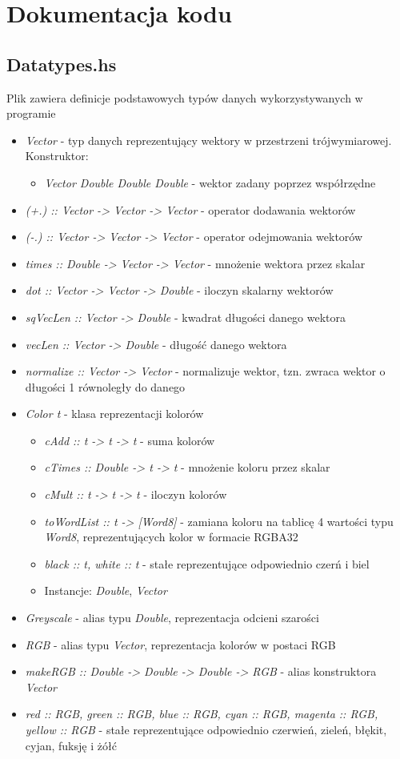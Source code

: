 \documentclass[11pt,a4paper]{article}
\begin{document}
\section{Dokumentacja kodu}
\subsection{Datatypes.hs}
Plik zawiera definicje podstawowych typów danych wykorzystywanych w programie
\begin{itemize}
\item\textit{Vector} - typ danych reprezentujący wektory w przestrzeni trójwymiarowej.\\Konstruktor:
\begin{itemize}
\item\textit{Vector Double Double Double} - wektor zadany poprzez współrzędne
\end{itemize}
\item\textit{(+.) :: Vector -> Vector -> Vector} - operator dodawania wektorów
\item\textit{(-.) :: Vector -> Vector -> Vector} - operator odejmowania wektorów
\item\textit{times :: Double -> Vector -> Vector} - mnożenie wektora przez skalar
\item\textit{dot :: Vector -> Vector -> Double} - iloczyn skalarny wektorów
\item\textit{sqVecLen :: Vector -> Double} - kwadrat długości danego wektora
\item\textit{vecLen :: Vector -> Double} - długość danego wektora
\item\textit{normalize :: Vector -> Vector} - normalizuje wektor, tzn. zwraca wektor o długości 1 równoległy do danego
\item\textit{Color t} - klasa reprezentacji kolorów
\begin{itemize}
\item\textit{cAdd :: t -> t -> t} - suma kolorów
\item\textit{cTimes :: Double -> t -> t} - mnożenie koloru przez skalar
\item\textit{cMult :: t -> t -> t} - iloczyn kolorów
\item\textit{toWordList :: t -> [Word8]} - zamiana koloru na tablicę 4 wartości typu \textit{Word8}, reprezentujących kolor w formacie RGBA32
\item\textit{black :: t, white :: t} - stałe reprezentujące odpowiednio czerń i biel
\item Instancje: \textit{Double}, \textit{Vector}
\end{itemize}
\item\textit{Greyscale} - alias typu \textit{Double}, reprezentacja odcieni szarości
\item\textit{RGB} - alias typu \textit{Vector}, reprezentacja kolorów w postaci RGB
\item\textit{makeRGB :: Double -> Double -> Double -> RGB} - alias konstruktora \textit{Vector}
\item\textit{red :: RGB, green :: RGB, blue :: RGB, cyan :: RGB, magenta :: RGB, yellow :: RGB} - stałe reprezentujące odpowiednio czerwień, zieleń,  błękit, cyjan, fuksję i żółć
\end{itemize}
\end{document}
